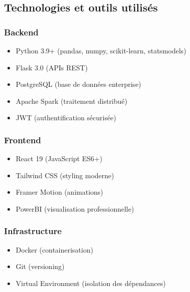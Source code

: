 \subsection{Technologies et outils utilisés}
\subsubsection{Backend}
\begin{itemize}
    \item Python 3.9+ (pandas, numpy, scikit-learn, statsmodels)
    \item Flask 3.0 (APIs REST)
    \item PostgreSQL (base de données enterprise)
    \item Apache Spark (traitement distribué)
    \item JWT (authentification sécurisée)
\end{itemize}

\subsubsection{Frontend}
\begin{itemize}
    \item React 19 (JavaScript ES6+)
    \item Tailwind CSS (styling moderne)
    \item Framer Motion (animations)
    \item PowerBI (visualisation professionnelle)
\end{itemize}

\subsubsection{Infrastructure}
\begin{itemize}
    \item Docker (containerisation)
    \item Git (versioning)
    \item Virtual Environment (isolation des dépendances)
\end{itemize}
